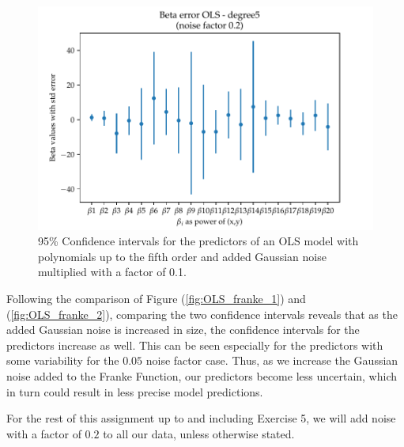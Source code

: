 \documentclass[11pt, a4paper]{article}
\begin{document}
\begin{figure}
  \centering
  \includegraphics[scale=.85]{figures/EX1_OLS_beta_error_degree5_mn.pdf}
  \caption{\label{fig:OLS_beta_2} 95\% Confidence intervals for the predictors of an OLS model with polynomials up to the fifth order and added Gaussian noise multiplied with a factor of 0.1.}
\end{figure}

Following the comparison of Figure (\ref{fig:OLS_franke_1}) and (\ref{fig:OLS_franke_2}), comparing the two confidence intervals reveals that as the added Gaussian noise is increased in size, the confidence intervals for the predictors increase as well. This can be seen especially for the predictors with some variability for the $0.05$ noise factor case. Thus, as we increase the Gaussian noise added to the Franke Function, our predictors become less uncertain, which in turn could result in less precise model predictions.

For the rest of this assignment up to and including Exercise 5, we will add noise with a factor of $0.2$ to all our data, unless otherwise stated.



\end{document}
